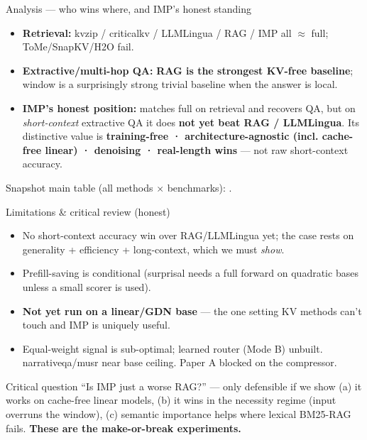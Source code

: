 \begin{frame}{Analysis --- who wins where, and IMP's honest standing}
  \small
  \begin{itemize}
    \item \textbf{Retrieval:} kvzip / criticalkv / LLMLingua / RAG / IMP all $\approx$ full; ToMe/SnapKV/H2O fail.
    \item \textbf{Extractive/multi-hop QA:} \textbf{RAG is the strongest KV-free baseline}; window is a surprisingly strong trivial baseline when the answer is local.
    \item \textbf{IMP's honest position:} matches full on retrieval and recovers QA, but on \emph{short-context} extractive QA it does \textbf{not yet beat RAG / LLMLingua}. Its distinctive value is \textbf{training-free · architecture-agnostic (incl. cache-free linear) · denoising · real-length wins} — not raw short-context accuracy.
  \end{itemize}
  \scriptsize Snapshot main table (all methods $\times$ benchmarks): .
\end{frame}

\begin{frame}{Limitations \& critical review (honest)}
  \small
  \begin{itemize}
    \item No short-context accuracy win over RAG/LLMLingua yet; the case rests on generality + efficiency + long-context, which we must \emph{show}.
    \item Prefill-saving is conditional (surprisal needs a full forward on quadratic bases unless a small scorer is used).
    \item \textbf{Not yet run on a linear/GDN base} — the one setting KV methods can't touch and IMP is uniquely useful.
    \item Equal-weight signal is sub-optimal; learned router (Mode B) unbuilt. narrativeqa/musr near base ceiling. Paper A blocked on the compressor.
  \end{itemize}
  \begin{block}{Critical question}
    ``Is IMP just a worse RAG?'' — only defensible if we show (a) it works on cache-free linear models, (b) it wins in the necessity regime (input overruns the window), (c) semantic importance helps where lexical BM25-RAG fails. \textbf{These are the make-or-break experiments.}
  \end{block}
\end{frame}

